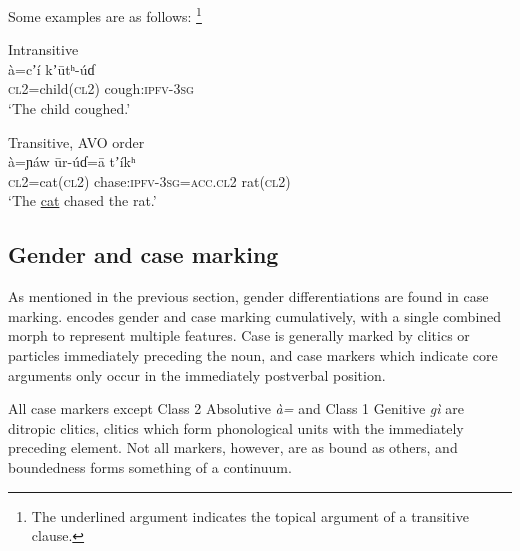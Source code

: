 \documentclass[output=collectionpaper,hidelinks]{langscibook}
\theoremstyle{remark}
\begin{document}
Some examples are as follows:%
\footnote{The underlined argument indicates the
topical argument of a transitive clause.}

\ea
Intransitive \\
\gll à=cʼí kʼūtʰ-úɗ \\
 \textsc{cl2}=child(\textsc{cl2}) cough:\textsc{ipfv}-\textsc{3sg} \\
\glt `The child coughed.' \\
\z

\ea
 Transitive, AVO order \\
 \gll à=ɲáw ūr-úɗ=ā tʼíkʰ \\
 \textsc{cl2}=cat(\textsc{cl2}) chase:\textsc{ipfv}-\textsc{3sg}=\textsc{acc.cl2} rat(\textsc{cl2}) \\
\glt `The \uline{cat} chased the rat.' \\
\z

%


\subsection{Gender and case marking}
\label{sec:Don:Case_Marking}

As mentioned in the previous section, gender differentiations are found in case
marking.  encodes gender and case marking cumulatively, with a single
combined morph to represent multiple features. Case is generally marked by
clitics or particles immediately preceding the noun, and case markers which
indicate core arguments only occur in the immediately postverbal position.

All case markers except Class 2 Absolutive \emph{à=} and Class 1 Genitive
\emph{gì} are ditropic clitics, clitics which form phonological units with the
immediately preceding element. Not all markers, however, are as bound as
others, and boundedness forms something of a continuum.
\end{document}
